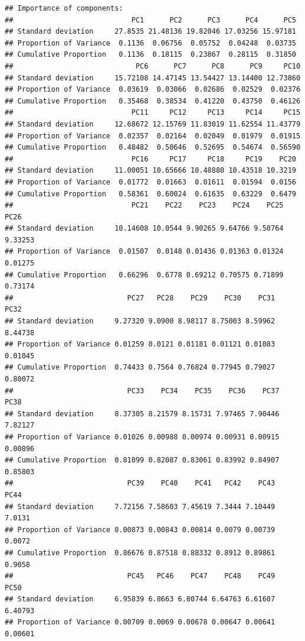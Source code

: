 \documentclass[openany]{book}
\begin{document}
\begin{verbatim}
## Importance of components:
##                            PC1      PC2      PC3      PC4      PC5
## Standard deviation     27.8535 21.48136 19.82046 17.03256 15.97181
## Proportion of Variance  0.1136  0.06756  0.05752  0.04248  0.03735
## Cumulative Proportion   0.1136  0.18115  0.23867  0.28115  0.31850
##                             PC6      PC7      PC8      PC9     PC10
## Standard deviation     15.72108 14.47145 13.54427 13.14400 12.73860
## Proportion of Variance  0.03619  0.03066  0.02686  0.02529  0.02376
## Cumulative Proportion   0.35468  0.38534  0.41220  0.43750  0.46126
##                            PC11     PC12     PC13     PC14     PC15
## Standard deviation     12.68672 12.15769 11.83019 11.62554 11.43779
## Proportion of Variance  0.02357  0.02164  0.02049  0.01979  0.01915
## Cumulative Proportion   0.48482  0.50646  0.52695  0.54674  0.56590
##                            PC16     PC17     PC18     PC19    PC20
## Standard deviation     11.00051 10.65666 10.48880 10.43518 10.3219
## Proportion of Variance  0.01772  0.01663  0.01611  0.01594  0.0156
## Cumulative Proportion   0.58361  0.60024  0.61635  0.63229  0.6479
##                            PC21    PC22    PC23    PC24    PC25    PC26
## Standard deviation     10.14608 10.0544 9.90265 9.64766 9.50764 9.33253
## Proportion of Variance  0.01507  0.0148 0.01436 0.01363 0.01324 0.01275
## Cumulative Proportion   0.66296  0.6778 0.69212 0.70575 0.71899 0.73174
##                           PC27   PC28    PC29    PC30    PC31    PC32
## Standard deviation     9.27320 9.0900 8.98117 8.75003 8.59962 8.44738
## Proportion of Variance 0.01259 0.0121 0.01181 0.01121 0.01083 0.01045
## Cumulative Proportion  0.74433 0.7564 0.76824 0.77945 0.79027 0.80072
##                           PC33    PC34    PC35    PC36    PC37    PC38
## Standard deviation     8.37305 8.21579 8.15731 7.97465 7.90446 7.82127
## Proportion of Variance 0.01026 0.00988 0.00974 0.00931 0.00915 0.00896
## Cumulative Proportion  0.81099 0.82087 0.83061 0.83992 0.84907 0.85803
##                           PC39    PC40    PC41   PC42    PC43   PC44
## Standard deviation     7.72156 7.58603 7.45619 7.3444 7.10449 7.0131
## Proportion of Variance 0.00873 0.00843 0.00814 0.0079 0.00739 0.0072
## Cumulative Proportion  0.86676 0.87518 0.88332 0.8912 0.89861 0.9058
##                           PC45   PC46    PC47    PC48    PC49    PC50
## Standard deviation     6.95839 6.8663 6.80744 6.64763 6.61607 6.40793
## Proportion of Variance 0.00709 0.0069 0.00678 0.00647 0.00641 0.00601

\end{verbatim}
\end{document}
